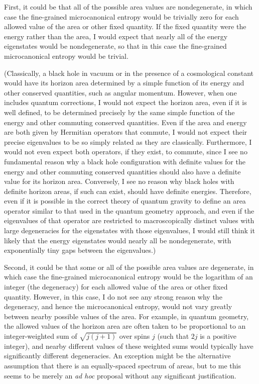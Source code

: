 \documentclass[12pt]{article} \usepackage{latexsym} \textwidth 15cm
\begin{document}
First, it could be that all of the possible area values are
nondegenerate, in which case the fine-grained microcanonical entropy
would be trivially zero for each allowed value of the area or other
fixed quantity.  If the fixed quantity were the energy rather than the
area, I would expect that nearly all of the energy eigenstates would be
nondegenerate, so that in this case the fine-grained microcanonical
entropy would be trivial.

(Classically, a black hole in vacuum or in the presence of a
cosmological constant would have its horizon area determined by a
simple function of its energy and other conserved quantities, such as
angular momentum.  However, when one includes quantum corrections, I
would not expect the horizon area, even if it is well defined, to be
determined precisely by the same simple function of the energy and
other commuting conserved quantities.  Even if the area and energy are
both given by Hermitian operators that commute, I would not expect
their precise eigenvalues to be so simply related as they are
classically.  Furthermore, I would not even expect both operators, if
they exist, to commute, since I see no fundamental reason why a black
hole configuration with definite values for the energy and other
commuting conserved quantities should also have a definite value for
its horizon area.  Conversely, I see no reason why black holes with
definite horizon areas, if such can exist, should have definite
energies.  Therefore, even if it is possible in the correct theory of
quantum gravity to define an area operator similar to that used in the
quantum geometry approach, and even if the eigenvalues of that operator
are restricted to macroscopically distinct values with large
degeneracies for the eigenstates with those eigenvalues, I would still
think it likely that the energy eigenstates would nearly all be
nondegenerate, with exponentially tiny gaps between the eigenvalues.)

Second, it could be that some or all of the possible area values are
degenerate, in which case the fine-grained microcanonical entropy would
be the logarithm of an integer (the degeneracy) for each allowed value
of the area or other fixed quantity.  However, in this case, I do not
see any strong reason why the degeneracy, and hence the microcanonical
entropy, would not vary greatly between nearby possible values of the
area.  For example, in quantum geometry, the allowed values of the
horizon area are often taken to be proportional to an integer-weighted
sum of $\sqrt{j(j+1)}$ over spins $j$ (such that $2j$ is a positive
integer), and nearby different values of these weighted sums would
typically have significantly different degeneracies.  An exception
might be the alternative assumption that there is an equally-spaced
spectrum of areas, but to me this seems to be merely an {\it ad hoc}
proposal without any significant justification.
\end{document}
